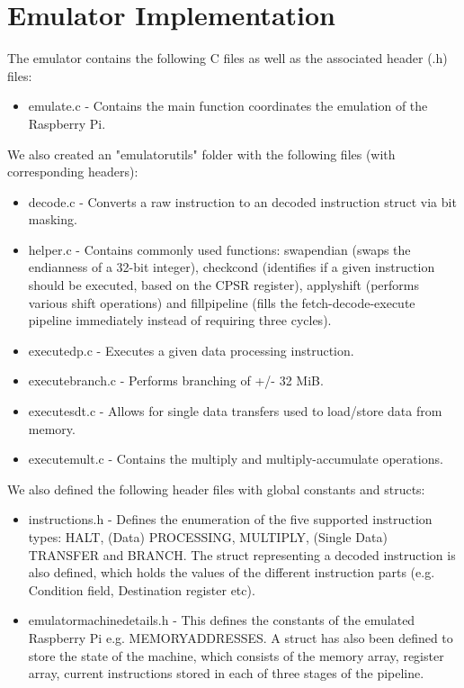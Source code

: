 \documentclass[11pt,twoside]{article}
\begin{document}
\section{Emulator Implementation}
The emulator contains the following C files as well as the associated header (.h) files:
\begin{itemize}
\item emulate.c - Contains the main function coordinates the emulation of the Raspberry Pi.
\end{itemize}

We also created an "emulator\textunderscore utils" folder with the following files (with corresponding headers):
\begin{itemize}
\item decode.c - Converts a raw instruction to an decoded instruction struct via bit masking.
\item helper.c - Contains commonly used functions: swap\textunderscore endian (swaps the endianness of a 32-bit integer), check\textunderscore cond (identifies if a given instruction should be executed, based on the CPSR register), apply\textunderscore shift (performs various shift operations) and fill\textunderscore pipeline (fills the fetch-decode-execute pipeline immediately instead of requiring three cycles).
\item execute\textunderscore dp.c - Executes a given data processing instruction.
\item execute\textunderscore branch.c - Performs branching of +/- 32 MiB.
\item execute\textunderscore sdt.c - Allows for single data transfers used to load/store data from memory.
\item execute\textunderscore mult.c - Contains the multiply and multiply-accumulate operations.
\end{itemize}

We also defined the following header files with global constants and structs:

\begin{itemize}
\item instructions.h - Defines the enumeration of the five supported instruction types: HALT, (Data) PROCESSING, MULTIPLY, (Single Data) TRANSFER and BRANCH. The struct representing a decoded instruction is also defined, which holds the values of the different instruction parts (e.g. Condition field, Destination register etc).    

\item emulator\textunderscore machine\textunderscore details.h - This defines the constants of the emulated Raspberry Pi e.g. MEMORY\textunderscore ADDRESSES. A struct has also been defined to store the state of the machine, which consists of the memory array, register array, current instructions stored in each of three stages of the pipeline.
\end{itemize}
\end{document}
